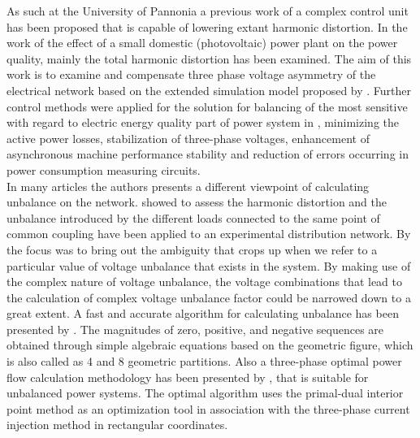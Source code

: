 As such at the University of Pannonia a previous work of \cite{gorbe2012reduction} a complex control unit has been proposed that is capable of lowering extant harmonic distortion. In the work of \cite{Gorbe2014experimental} the effect of a small domestic (photovoltaic) power plant on the power quality, mainly the total harmonic distortion has been examined. The aim of this work is to examine and compensate three phase voltage asymmetry of the electrical network based on the extended simulation model proposed by \cite{gorbe2012reduction}. Further control methods were applied for the solution for balancing of the most sensitive with regard to electric energy quality part of power system in \cite{uimethod},  minimizing the active power losses, stabilization of three-phase voltages, enhancement of asynchronous machine performance stability and reduction of errors occurring in power consumption measuring circuits.\\

In many articles the authors presents a different viewpoint of calculating unbalance on the network. \cite{martin2015unbalance} showed to assess the harmonic distortion and the unbalance introduced by the different loads connected to the same point of common coupling have been applied to an experimental distribution network.  By \cite{kini2007novel} the focus was to bring out the ambiguity that crops up when we refer to a particular value of voltage unbalance that exists in the system. By making use of the complex nature of voltage unbalance, the voltage combinations that lead to the calculation of complex voltage unbalance factor could be narrowed down to a great extent. A fast and accurate algorithm for calculating unbalance has been presented by \cite{wen2014approximate}. The magnitudes of zero, positive, and negative sequences are obtained through simple algebraic equations based on the geometric figure, which is also called as 4 and 8 geometric partitions. Also a three-phase optimal power flow calculation methodology has been presented by \cite{araujo2013three}, that is suitable for unbalanced power systems. The optimal algorithm uses the primal-dual interior point method as an optimization tool in association with the three-phase current injection method in rectangular coordinates.\\

